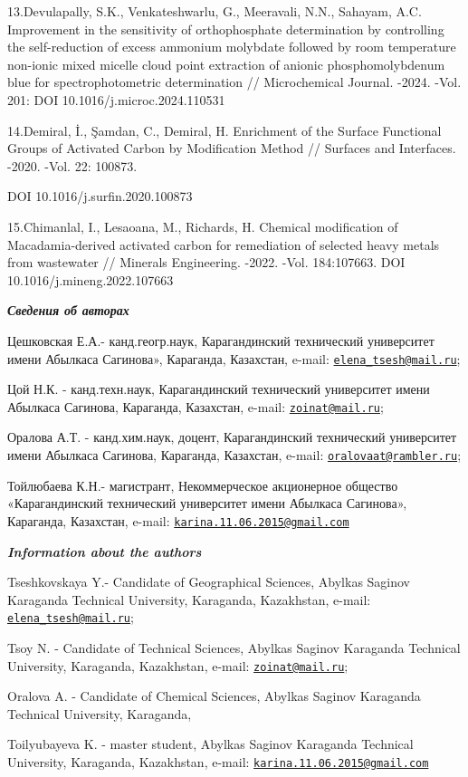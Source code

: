 13.Devulapally, S.K., Venkateshwarlu, G., Meeravali, N.N., Sahayam, A.C.
Improvement in the sensitivity of orthophosphate determination by
controlling the self-reduction of excess ammonium molybdate followed by
room temperature non-ionic mixed micelle cloud point extraction of
anionic phosphomolybdenum blue for spectrophotometric determination //
Microchemical Journal. -2024. -Vol. 201: DOI
10.1016/j.microc.2024.110531

14.Demiral, İ., Şamdan, C., Demiral, H. Enrichment of the Surface
Functional Groups of Activated Carbon by Modification Method // Surfaces
and Interfaces. -2020. -Vol. 22: 100873.

DOI 10.1016/j.surfin.2020.100873

15.Chimanlal, I., Lesaoana, M., Richards, H. Chemical modification of
Macadamia-derived activated carbon for remediation of selected heavy
metals from wastewater // Minerals Engineering. -2022. -Vol. 184:107663.
DOI 10.1016/j.mineng.2022.107663

\emph{{\bfseries Сведения об авторах}}

Цешковская Е.А.- канд.геогр.наук, Карагандинский технический университет
имени Абылкаса Сагинова», Караганда, Казахстан, e-mail:
\href{mailto:elena_tsesh@mail.ru}{\nolinkurl{elena\_tsesh@mail.ru}};

Цой Н.К. - канд.техн.наук, Карагандинский технический университет имени
Абылкаса Сагинова, Караганда, Казахстан, e-mail:
\href{mailto:zoinat@mail.ru}{\nolinkurl{zoinat@mail.ru}};

Оралова А.Т. - канд.хим.наук, доцент, Карагандинский технический
университет имени Абылкаса Сагинова, Караганда, Казахстан, e-mail:
\href{mailto:oralovaat@rambler.ru}{\nolinkurl{oralovaat@rambler.ru}};

Тойлюбаева К.Н.- магистрант, Некоммерческое акционерное общество
«Карагандинский технический университет имени Абылкаса Сагинова»,
Караганда, Казахстан, e-mail:
\href{mailto:karina.11.06.2015@gmail.com}{\nolinkurl{karina.11.06.2015@gmail.com}}

\emph{{\bfseries Information about the authors}}

Tseshkovskaya Y.- Candidate of Geographical Sciences, Abylkas Saginov
Karaganda Technical University, Karaganda, Kazakhstan, e-mail:
\href{mailto:elena_tsesh@mail.ru}{\nolinkurl{elena\_tsesh@mail.ru}};

Tsoy N. - Candidate of Technical Sciences, Abylkas Saginov Karaganda
Technical University, Karaganda, Kazakhstan, e-mail:
\href{mailto:zoinat@mail.ru}{\nolinkurl{zoinat@mail.ru}};

Oralova A. - Candidate of Chemical Sciences, Abylkas Saginov Karaganda
Technical University, Karaganda,

Toilyubayeva K. - master student, Abylkas Saginov Karaganda Technical
University, Karaganda, Kazakhstan, e-mail:
\href{mailto:karina.11.06.2015@gmail.com}{\nolinkurl{karina.11.06.2015@gmail.com}}